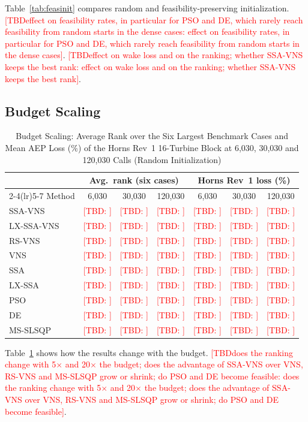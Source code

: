 \documentclass[journal,twoside]{IEEEtran}
\newcommand{\TBD}[1]{\textcolor{red}{[TBD\ifx\relax#1\relax\else: #1\fi]}}
\begin{document}
Table~\ref{tab:feasinit} compares random and feasibility-preserving initialization. \TBD{effect on feasibility rates, in particular for PSO and DE, which rarely reach feasibility from random starts in the dense cases}. \TBD{effect on wake loss and on the ranking; whether SSA-VNS keeps the best rank}.

\subsection{Budget Scaling}
\label{sec:budget}
\begin{table}[!t]
\centering
\caption{Budget Scaling: Average Rank over the Six Largest Benchmark Cases and Mean AEP Loss (\%) of the Horns Rev~1 16-Turbine Block at 6,030, 30,030 and 120,030 Calls (Random Initialization)}
\label{tab:budget}
\scriptsize\setlength{\tabcolsep}{2.5pt}
\begin{tabular}{lcccccc}
\toprule
& \multicolumn{3}{c}{Avg.\ rank (six cases)} & \multicolumn{3}{c}{Horns Rev~1 loss (\%)} \\
\cmidrule(lr){2-4}\cmidrule(lr){5-7}
Method & 6,030 & 30,030 & 120,030 & 6,030 & 30,030 & 120,030 \\
\midrule
SSA-VNS & \TBD{} & \TBD{} & \TBD{} & \TBD{} & \TBD{} & \TBD{} \\
LX-SSA-VNS & \TBD{} & \TBD{} & \TBD{} & \TBD{} & \TBD{} & \TBD{} \\
RS-VNS & \TBD{} & \TBD{} & \TBD{} & \TBD{} & \TBD{} & \TBD{} \\
VNS & \TBD{} & \TBD{} & \TBD{} & \TBD{} & \TBD{} & \TBD{} \\
SSA & \TBD{} & \TBD{} & \TBD{} & \TBD{} & \TBD{} & \TBD{} \\
LX-SSA & \TBD{} & \TBD{} & \TBD{} & \TBD{} & \TBD{} & \TBD{} \\
PSO & \TBD{} & \TBD{} & \TBD{} & \TBD{} & \TBD{} & \TBD{} \\
DE & \TBD{} & \TBD{} & \TBD{} & \TBD{} & \TBD{} & \TBD{} \\
MS-SLSQP & \TBD{} & \TBD{} & \TBD{} & \TBD{} & \TBD{} & \TBD{} \\
\bottomrule
\end{tabular}
\end{table}

Table~\ref{tab:budget} shows how the results change with the budget. \TBD{does the ranking change with 5$\times$ and 20$\times$ the budget; does the advantage of SSA-VNS over VNS, RS-VNS and MS-SLSQP grow or shrink; do PSO and DE become feasible}.
\end{document}
